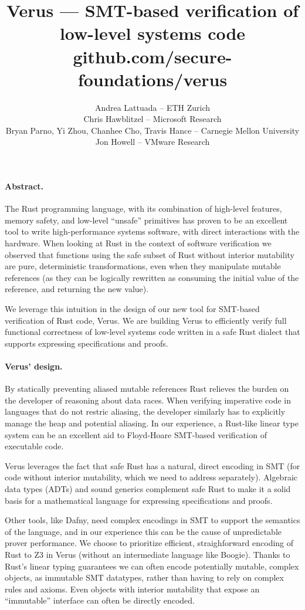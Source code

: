 \documentclass[10pt]{article}
\date{}
\title{Verus --- SMT-based verification of low-level systems code\\\small github.com/secure-foundations/verus}
\author{Andrea Lattuada -- ETH Zurich \\
Chris Hawblitzel -- Microsoft Research \\
Bryan Parno, Yi Zhou, Chanhee Cho, Travis Hance -- Carnegie Mellon University \\
Jon Howell -- VMware Research}
\renewcommand{\section}[1]{\paragraph{#1.}}
\begin{document}
\maketitle

\section{Abstract}\label{abstract}

The Rust programming language, with its combination of high-level
features, memory safety, and low-level ``unsafe'' primitives has proven
to be an excellent tool to write high-performance systems software, with
direct interactions with the hardware.
When looking at Rust in the context of software verification
we observed that functions using the safe subset of Rust without
interior mutability are pure, deterministic transformations, even when
they manipulate mutable references (as they can be logically rewritten
as consuming the initial value of the reference, and returning the new
value).

We leverage this intuition in the design of our new tool for SMT-based
verification of Rust code, Verus.
We are building Verus to efficiently verify full functional correctness
of low-level systems code written in a safe Rust dialect that supports
expressing specifications and proofs.

\section{Verus' design}\label{verus-design}

By statically preventing aliased mutable references Rust
relieves the burden on the developer of reasoning about data races.
When verifying imperative code in languages that do not restric aliasing, the
developer similarly has to explicitly manage the heap and potential
aliasing. In our experience, a Rust-like linear type system can be an
excellent aid to Floyd-Hoare SMT-based verification of executable code.

Verus leverages the fact that safe Rust has a natural, direct encoding
in SMT (for code without interior mutability, which we need to address
separately). Algebraic data types (ADTs) and sound generics complement
safe Rust to make it a solid basis for a mathematical language for
expressing specifications and proofs.

Other tools, like Dafny, need complex encodings in SMT to support the
semantics of the language, and in our
experience this can be the cause of unpredictable prover performance.
We choose to prioritize efficient, straighforward encoding of Rust to Z3 in
Verus (without an intermediate language like Boogie).
Thanks to Rust's linear typing guarantees we can
often encode potentially mutable, complex objects, as immutable SMT
datatypes, rather than having to rely on complex rules and axioms. Even
objects with interior mutability that expose an ``immutable''
interface can often be directly encoded.
\end{document}
